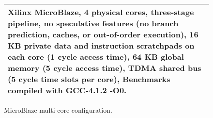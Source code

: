 \begin{figure}
	\centering
	\def\arraystretch{1.3}
	\begin{tabular}{|p{\textwidth}|}
		\hline
		Xilinx MicroBlaze, 4 physical cores, three-stage pipeline, no speculative	
		features (no branch prediction,	caches, or out-of-order execution), 
		16 KB private data and instruction scratchpads on each core (1 cycle access time), 
		64 KB global memory (5 cycle access time), TDMA shared bus (5 cycle time slots per			
		core), Benchmarks compiled with GCC-4.1.2 -O0.
		\\ \hline
	\end{tabular}
	
	\caption{MicroBlaze multi-core configuration.}
	\label{fig:results_embedded_specs}
\end{figure}

\begin{table}
	\centering
	\def\arraystretch{1.3}
\end{table}

